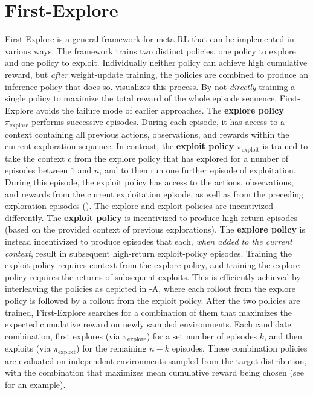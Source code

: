 \documentclass{article}
\begin{document}
\section{First-Explore}
\label{sec:overview}
\FloatBarrier
First-Explore is a general framework for meta-RL that can be implemented in various ways. The framework trains two distinct policies, one policy to explore and one policy to exploit. Individually neither policy can achieve high cumulative reward, but \emph{after} weight-update training, the policies are combined to produce an inference policy that does so.  visualizes this process. By not \emph{directly} training a single policy to maximize the total reward of the whole episode sequence, First-Explore avoids the failure mode of earlier approaches.
The \textbf{explore policy} \(\pi_{\text{explore}}\) performs successive episodes. During each episode, it has access to a context containing all previous actions, observations, and rewards within the current exploration sequence. In contrast, the \textbf{exploit policy} \(\pi_{\text{exploit}}\) is trained to take the context \(c\) from the explore policy that has explored for a number of episodes between \(1\) and  \(n\), and to then run one further episode of exploitation. During this episode, the exploit policy has access to the actions, observations, and rewards from the current exploitation episode, as well as from the preceding exploration episodes ().
The explore and exploit policies are incentivized differently. The \textbf{exploit policy} is incentivized to produce high-return episodes (based on the provided context of previous explorations). The \textbf{explore policy} is instead incentivized to produce episodes that each, \emph{when added to the current context}, result in subsequent high-return exploit-policy episodes. Training the exploit policy requires context from the explore policy, and training the explore policy requires the returns of subsequent exploits. This is efficiently achieved by interleaving the policies as depicted in -A, where each rollout from the explore policy is followed by a rollout from the exploit policy.
After the two policies are trained, First-Explore searches for a combination of them that maximizes the expected cumulative reward on newly sampled environments.
Each candidate combination, first explores (via \(\pi_{\text{explore}}\)) for a set number of episodes \(k\), and then exploits (via \(\pi_{\text{exploit}}\)) for the remaining \(n-k\) episodes. These combination policies are evaluated on independent environments sampled from the target distribution, with the combination that maximizes mean cumulative reward being chosen (see  for an example).
\end{document}
